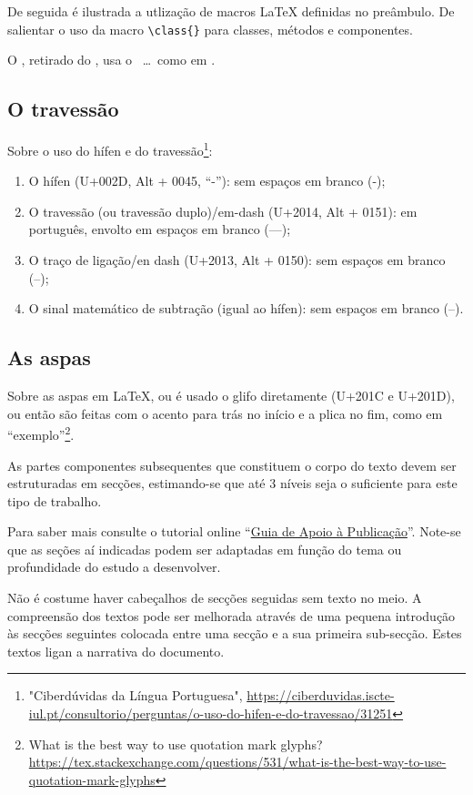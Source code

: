 \begin{info}
De seguida é ilustrada a utlização de macros \LaTeX{} definidas no
preâmbulo.
De salientar o uso da macro \verb!\class{}! para classes, métodos e componentes.
\end{info}

O \windspt, retirado do \windscannerpt, usa o \svg\ \ldots\ como em .
\lipsum[9]

\lipsum[10]

\subsection*{O travessão}

Sobre o uso do hífen e do travessão\footnote{"Ciberdúvidas da Língua Portuguesa", \url{https://ciberduvidas.iscte-iul.pt/consultorio/perguntas/o-uso-do-hifen-e-do-travessao/31251}}: 
\begin{enumerate}
    \item O hífen (U+002D, Alt + 0045, ``-''): sem espaços em branco (-);
    \item O travessão (ou travessão duplo)/em-dash (U+2014, Alt + 0151): em português, envolto em espaços em branco (---);
    \item O traço de ligação/en dash (U+2013, Alt + 0150): sem espaços em branco (--);
    \item O sinal matemático de subtração (igual ao hífen): sem espaços em branco (–).
\end{enumerate}

\lipsum[11]

\subsection*{As aspas}

Sobre as aspas  em \LaTeX, ou é usado o glifo diretamente (U+201C e U+201D), ou então são feitas com o acento para trás no início e a plica no fim, como em ``exemplo''\footnote{What is the best way to use quotation mark glyphs? 
\url{https://tex.stackexchange.com/questions/531/what-is-the-best-way-to-use-quotation-mark-glyphs}}.

\begin{info}
As partes componentes subsequentes que constituem o corpo do texto
devem ser estruturadas em secções, estimando-se que até 3 níveis seja
o suficiente para este tipo de trabalho.

Para saber mais consulte o tutorial online 
``\href{https://docs.google.com/document/d/1TDC1behVq8x7fQL4CcPEEh_np5GXviJevQxnQ9gbiJs/edit}
{Guia de Apoio à Publicação}''.
Note-se que as seções aí indicadas podem ser adaptadas em função do tema
ou profundidade do estudo a desenvolver.
\end{info}

\begin{info}
Não é costume haver cabeçalhos de secções seguidas sem texto no meio.
A compreensão dos textos pode ser melhorada através de uma pequena 
introdução às secções seguintes colocada entre uma secção e a sua primeira sub-secção. Estes textos ligan a narrativa
do documento.
\end{info}

